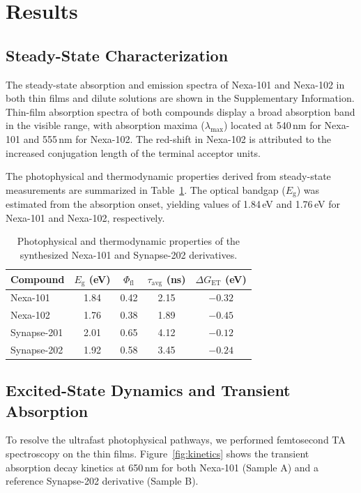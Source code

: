 \section{Results}
\subsection{Steady-State Characterization}
The steady-state absorption and emission spectra of Nexa-101 and Nexa-102 in both thin films and dilute solutions are shown in the Supplementary Information. Thin-film absorption spectra of both compounds display a broad absorption band in the visible range, with absorption maxima ($\lambda_{\text{max}}$) located at 540\,nm for Nexa-101 and 555\,nm for Nexa-102. The red-shift in Nexa-102 is attributed to the increased conjugation length of the terminal acceptor units.

The photophysical and thermodynamic properties derived from steady-state measurements are summarized in Table~\ref{tab:properties}. The optical bandgap ($E_{\text{g}}$) was estimated from the absorption onset, yielding values of 1.84\,eV and 1.76\,eV for Nexa-101 and Nexa-102, respectively.

\begin{table}[h]
  \centering
  \caption{Photophysical and thermodynamic properties of the synthesized Nexa-101 and Synapse-202 derivatives.}
  \label{tab:properties}
  \begin{tabular}{l c c c c}
    \toprule
    Compound & $E_{\text{g}}$ (eV) & $\Phi_{\text{fl}}$ & $\tau_{\text{avg}}$ (ns) & $\Delta G_{\text{ET}}$ (eV) \\
    \midrule
    Nexa-101 & 1.84 & 0.42 & 2.15 & $-0.32$ \\
    Nexa-102 & 1.76 & 0.38 & 1.89 & $-0.45$ \\
    Synapse-201 & 2.01 & 0.65 & 4.12 & $-0.12$ \\
    Synapse-202 & 1.92 & 0.58 & 3.45 & $-0.24$ \\
    \bottomrule
  \end{tabular}
\end{table}

\subsection{Excited-State Dynamics and Transient Absorption}
To resolve the ultrafast photophysical pathways, we performed femtosecond TA spectroscopy on the thin films. Figure~\ref{fig:kinetics} shows the transient absorption decay kinetics at 650\,nm for both Nexa-101 (Sample A) and a reference Synapse-202 derivative (Sample B).

